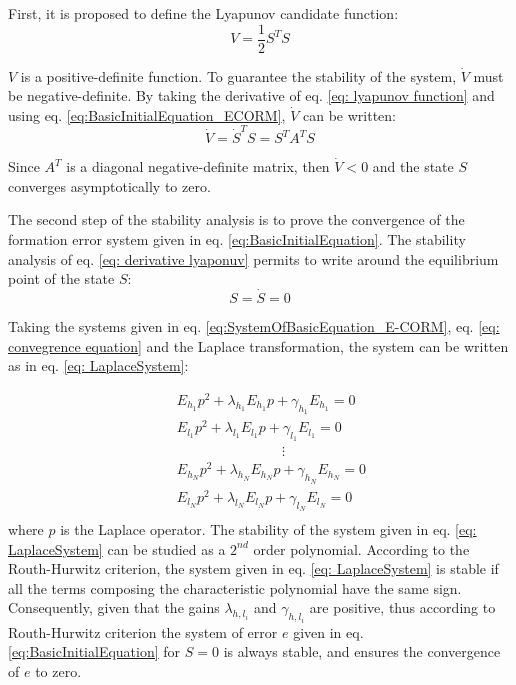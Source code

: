 First, it is proposed to define the Lyapunov candidate function: 
\begin{equation} \label{eq: lyapunov function}
    V= \frac{1}{2}S^{T}S
\end{equation}

$V$ is a positive-definite function. To guarantee the stability of the system, $\dot{V}$ must be negative-definite. By taking the derivative of eq. \ref{eq: lyapunov function} and using eq. \ref{eq:BasicInitialEquation_ECORM}, $\dot{V}$ can be written: 
\begin{equation}\label{eq: derivative lyaponuv}
    \dot{V}= \dot{S}^{T}S = S^{T}A^{T}S
\end{equation}

Since $A^T$ is a diagonal negative-definite matrix, then $\dot{V} < 0$ and the state $S$ converges asymptotically to zero.

The second step of the stability analysis is to prove the convergence of the formation error system given in eq. \ref{eq:BasicInitialEquation}. The stability analysis of eq. \ref{eq: derivative lyaponuv} permits to write around the equilibrium point of the state $S$: 
\begin{equation} \label{eq: convegrence equation}
    S=\dot{S}=0
\end{equation}

Taking the systems given in eq. \ref{eq:SystemOfBasicEquation_E-CORM}, eq. \ref{eq: convegrence equation} and the Laplace transformation, the system can be written as in eq. \ref{eq: LaplaceSystem}: 

\begin{eqnarray} \label{eq: LaplaceSystem}
    &&{E}_{h_{1}} p^2+ \lambda_{h_{1}}E_{h_{1}}p +\gamma_{h_{1}} E_{h_{1}} = 0\\ \nonumber
   &&{E}_{l_{1}} p^2+ \lambda_{l_{1}}E_{l_{1}} p +\gamma_{l_{1}} E_{l_{1}} = 0\\ \nonumber
      \; \; \;   &&\; \; \; \; \; \; \; \; \; \; \; \; \; \; \; \; \; \; \; \; \; \; \; \; 
      \; \; \; \vdots& \\ \nonumber
  &&{E}_{h_{N}} p^2 + \lambda_{h_{N}}E_{h_{N}} p +\gamma_{h_{N}} E_{h_{N}}= 0\\ \nonumber
  &&{E}_{l_{N}} p^2 + \lambda_{l_{N}}E_{l_{N}} p +\gamma_{l_{N}} E_{l_{N}}= 0\\ \nonumber
\end{eqnarray}
where $p$ is the Laplace operator. 
The stability of the system given in eq. \ref{eq: LaplaceSystem} can be studied as a $2^{nd}$ order polynomial. According to the Routh-Hurwitz criterion, the system given in eq. \ref{eq: LaplaceSystem} is stable if all the terms composing the characteristic polynomial have the same sign. Consequently, given that the gains $\lambda_{h,l_{i}}$ and $\gamma_{h,l_{i}}$ are positive, thus according to Routh-Hurwitz criterion the system of error $e$ given in eq. \ref{eq:BasicInitialEquation} for $S=0$ is always stable, and ensures the convergence of $e$ to zero. 

